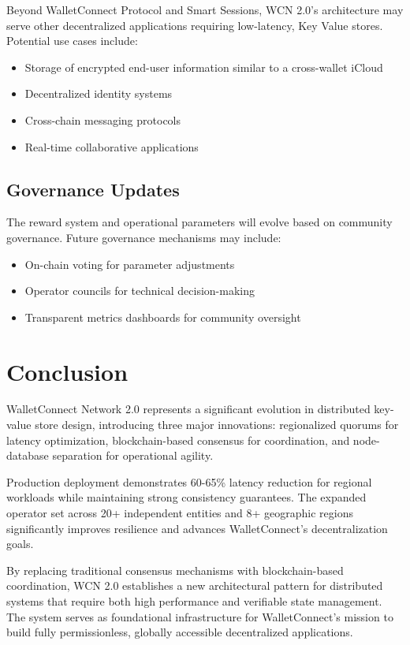 \documentclass[10pt,twocolumn]{article}
\begin{document}
Beyond WalletConnect Protocol and Smart Sessions, WCN 2.0's architecture may serve other decentralized applications requiring low-latency, Key Value stores. Potential use cases include:
\begin{itemize}
    \item Storage of encrypted end-user information similar to a cross-wallet iCloud
    \item Decentralized identity systems
    \item Cross-chain messaging protocols
    \item Real-time collaborative applications
\end{itemize}

\subsection{Governance Updates}

The reward system and operational parameters will evolve based on community governance. Future governance mechanisms may include:
\begin{itemize}
    \item On-chain voting for parameter adjustments
    \item Operator councils for technical decision-making
    \item Transparent metrics dashboards for com\-munity over\-sight
\end{itemize}

\section{Conclusion}

WalletConnect Network 2.0 represents a significant evolution in distributed key-value store design, introducing three major innovations: regionalized quorums for latency optimization, blockchain-based consensus for coordination, and node-database separation for operational agility.

Production deployment demonstrates 60-65\% latency re\-duction for regional workloads while main\-taining strong consistency guarantees. The expanded operator set across 20+ independent entities and 8+ geographic regions significantly improves resilience and advances WalletConnect's decentralization goals.

By replacing traditional consensus mechanisms with blockchain-based coordination, WCN 2.0 establishes a new architectural pattern for distributed systems that require both high performance and verifiable state management. The system serves as foundational infrastructure for WalletConnect's mission to build fully permissionless, globally accessible decentralized applications.
\end{document}
